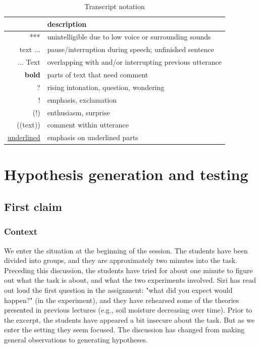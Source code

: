\begin{table}[H]
	\begin{center}
		\begin{tabular}{r l} \toprule
			 &  description \\ \midrule 
			 *** & unintelligible due to low voice or surrounding sounds \\
			 text ... & pause/interruption during speech; unfinished sentence \\
			 ... Text & overlapping with and/or interrupting previous utterance \\
			 \textbf{bold} & parts of text that need comment \\
			 ? & rising intonation, question, wondering \\
			 ! & emphasis, exclamation \\
			 (!) & enthusiasm, surprise \\
			 ((text)) & comment within utterance \\
			 \underline{underlined} & emphasis on underlined parts \\
			 \bottomrule

\end{tabular}
\end{center}
\caption{Transcript notation}
\end{table}


\section{Hypothesis generation and testing}
\label{cha:hypothesisgeneration}
\subsection{First claim}
\subsubsection*{Context}
\label{firsthypothesis}
We enter the situation at the beginning of the session. The students have been divided into groups, and they are approximately two minutes into the task. Preceding this discussion, the students have tried for about one minute to figure out what the task is about, and what the two experiments involved. Siri has read out loud the first question in the assignment: "what did you expect would happen?" (in the experiment), and they have rehearsed some of the theories presented in previous lectures (e.g., soil moisture decreasing over time). Prior to the excerpt, the students have appeared a bit insecure about the task. But as we enter the setting they seem focused. The discussion has changed from making general observations to generating hypotheses.

